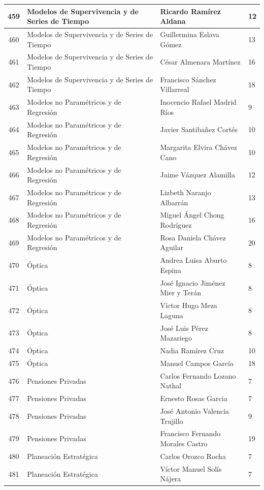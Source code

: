 {\begin{longtable}{|c|p{6.5cm}|p{5cm}|p{1.5cm}|}
  459 & Modelos de Supervivencia y de Series de Tiempo & Ricardo Ramírez Aldana & 12 \\ \hline
  460 & Modelos de Supervivencia y de Series de Tiempo & Guillermina Eslava Gómez & 13 \\ \hline
  461 & Modelos de Supervivencia y de Series de Tiempo & César Almenara Martínez & 16 \\ \hline
  462 & Modelos de Supervivencia y de Series de Tiempo & Francisco Sánchez Villarreal & 18 \\ \hline
  463 & Modelos no Paramétricos y de Regresión & Inocencio Rafael Madrid Ríos & 9 \\ \hline
  464 & Modelos no Paramétricos y de Regresión & Javier Santibañez Cortés & 10 \\ \hline
  465 & Modelos no Paramétricos y de Regresión & Margarita Elvira Chávez Cano & 10 \\ \hline
  466 & Modelos no Paramétricos y de Regresión & Jaime Vázquez Alamilla & 12 \\ \hline
  467 & Modelos no Paramétricos y de Regresión & Lizbeth Naranjo Albarrán & 13 \\ \hline
  468 & Modelos no Paramétricos y de Regresión & Miguel Ángel Chong Rodríguez & 16 \\ \hline
  469 & Modelos no Paramétricos y de Regresión & Rosa Daniela Chávez Aguilar & 20 \\ \hline
  470 & Óptica & Andrea Luisa Aburto Espina & 8 \\ \hline
  471 & Óptica & José Ignacio Jiménez Mier y Terán & 8 \\ \hline
  472 & Óptica & Víctor Hugo Meza Laguna & 8 \\ \hline
  473 & Óptica & José Luis Pérez Mazariego & 8 \\ \hline
  474 & Óptica & Nadia Ramírez Cruz & 10 \\ \hline
  475 & Óptica & Manuel Campos García & 18 \\ \hline
  476 & Pensiones Privadas & Carlos Fernando Lozano Nathal & 7 \\ \hline
  477 & Pensiones Privadas & Ernesto Rosas Garcia & 7 \\ \hline
  478 & Pensiones Privadas & José Antonio Valencia Trujillo & 9 \\ \hline
  479 & Pensiones Privadas & Francisco Fernando Morales Castro & 19 \\ \hline
  480 & Planeación Estratégica & Carlos Orozco Rocha & 7 \\ \hline
  481 & Planeación Estratégica & Víctor Manuel Solís Nájera & 7 \\ \hline

\end{longtable}}
